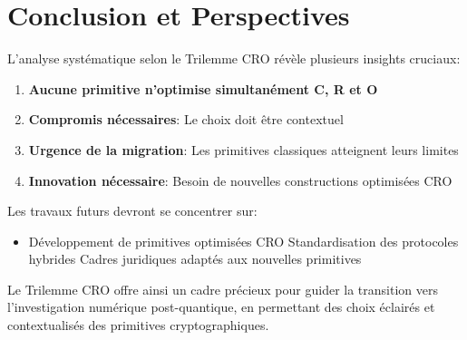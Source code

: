 \section{Conclusion et Perspectives}
L'analyse systématique selon le Trilemme CRO révèle plusieurs insights cruciaux:

\begin{enumerate}
\item \textbf{Aucune primitive n'optimise simultanément C, R et O}
\item \textbf{Compromis nécessaires}: Le choix doit être contextuel
\item \textbf{Urgence de la migration}: Les primitives classiques atteignent leurs limites
\item \textbf{Innovation nécessaire}: Besoin de nouvelles constructions optimisées CRO
\end{enumerate}

Les travaux futurs devront se concentrer sur:
\begin{itemize}
\item Développement de primitives optimisées CRO
Standardisation des protocoles hybrides
Cadres juridiques adaptés aux nouvelles primitives
\end{itemize}

Le Trilemme CRO offre ainsi un cadre précieux pour guider la transition vers l'investigation numérique post-quantique, en permettant des choix éclairés et contextualisés des primitives cryptographiques.